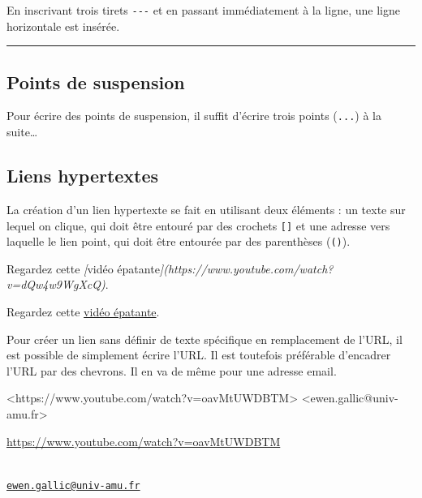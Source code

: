 \documentclass[
  11pt,
]{book}
\newenvironment{Shaded}{\begin{snugshade}}{\end{snugshade}}
\newcommand{\CommentTok}[1]{\textcolor[rgb]{0.56,0.35,0.01}{\textit{#1}}}
\newcommand{\NormalTok}[1]{#1}
\newcommand{\OtherTok}[1]{\textcolor[rgb]{0.56,0.35,0.01}{#1}}
\numberwithin{equation}{section}
\numberwithin{countremarque}{section}
\begin{document}
En inscrivant trois tirets \texttt{-\/-\/-} et en passant immédiatement à la ligne, une ligne horizontale est insérée.

\begin{center}\rule{0.5\linewidth}{0.5pt}\end{center}

\hypertarget{points-de-suspension}{%
\subsection{Points de suspension}\label{points-de-suspension}}

Pour écrire des points de suspension, il suffit d'écrire trois points (\texttt{...}) à la suite\ldots{}

\hypertarget{liens-hypertextes}{%
\subsection{Liens hypertextes}\label{liens-hypertextes}}

La création d'un lien hypertexte se fait en utilisant deux éléments : un texte sur lequel on clique, qui doit être entouré par des crochets \texttt{{[}{]}} et une adresse vers laquelle le lien point, qui doit être entourée par des parenthèses (\texttt{()}).

\begin{Shaded}
\begin{Highlighting}[]
\NormalTok{Regardez cette }\CommentTok{[}\OtherTok{vidéo épatante}\CommentTok{](https://www.youtube.com/watch?v=dQw4w9WgXcQ)}\NormalTok{.}
\end{Highlighting}
\end{Shaded}

Regardez cette \href{https://www.youtube.com/watch?v=dQw4w9WgXcQ}{vidéo épatante}.

Pour créer un lien sans définir de texte spécifique en remplacement de l'URL, il est possible de simplement écrire l'URL. Il est toutefois préférable d'encadrer l'URL par des chevrons. Il en va de même pour une adresse email.

\begin{Shaded}
\begin{Highlighting}[]
\OtherTok{\textless{}https://www.youtube.com/watch?v=oavMtUWDBTM\textgreater{}}  
\OtherTok{\textless{}ewen.gallic@univ{-}amu.fr\textgreater{}}
\end{Highlighting}
\end{Shaded}

\url{https://www.youtube.com/watch?v=oavMtUWDBTM}\strut \\
\href{mailto:ewen.gallic@univ-amu.fr}{\nolinkurl{ewen.gallic@univ-amu.fr}}
\end{document}
